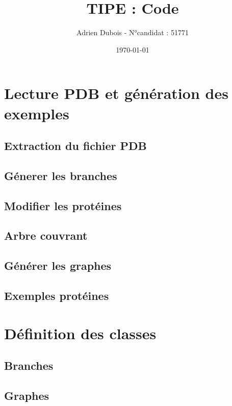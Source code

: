 \documentclass[a4paper, french, twoside]{article}
\title{TIPE : Code}
\author{Adrien Dubois - N°candidat : 51771}
\date{\today}
\begin{document}
\maketitle
\tableofcontents

\section{Lecture PDB et génération des exemples}

\subsection{Extraction du fichier PDB}

\subsection{Génerer les branches}

\subsection{Modifier les protéines}

\subsection{Arbre couvrant}

\subsection{Générer les graphes}

\subsection{Exemples protéines}


\section{Définition des classes}

\subsection{Branches}

\subsection{Graphes}

\end{document}
